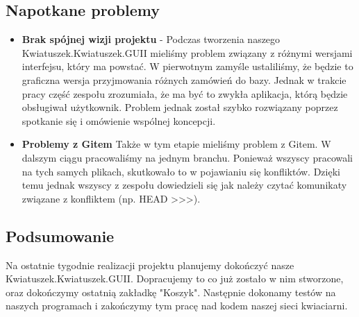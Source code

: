 \documentclass{article}
\begin{document}
        \subsection{Napotkane problemy}\begin{itemize}
        
            \item \textbf{Brak spójnej wizji projektu} -
            Podczas tworzenia naszego Kwiatuszek.Kwiatuszek.GUII mieliśmy problem związany z różnymi wersjami interfejsu, który ma powstać. W pierwotnym zamyśle ustaliliśmy, że będzie to graficzna wersja przyjmowania różnych zamówień do bazy. Jednak w trakcie pracy część zespołu zrozumiała, że ma być to zwykła aplikacja, którą będzie obsługiwał użytkownik. Problem jednak został szybko rozwiązany poprzez spotkanie się i omówienie wspólnej koncepcji.
            \item \textbf{Problemy z Gitem}
            Także w tym etapie mieliśmy problem z Gitem. W dalszym ciągu pracowaliśmy na jednym branchu. Ponieważ wszyscy pracowali na tych samych plikach, skutkowało to w pojawianiu się konfliktów. Dzięki temu jednak wszyscy z zespołu dowiedzieli się jak należy czytać komunikaty związane z konfliktem (np. HEAD >>>).
        \end{itemize}
        \subsection{Podsumowanie}
        Na ostatnie tygodnie realizacji projektu planujemy dokończyć nasze Kwiatuszek.Kwiatuszek.GUII. Dopracujemy to co już zostało w nim stworzone, oraz dokończymy ostatnią zakładkę "Koszyk". Następnie dokonamy testów na naszych programach i zakończymy tym pracę nad kodem naszej sieci kwiaciarni.
\end{document}
